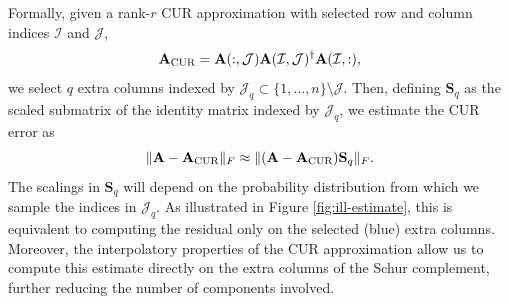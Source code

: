 \documentclass[11pt]{article}
\newcommand{\curX}{\mathbf{A}_{\textup{CUR}}}
\begin{document}
Formally, given a rank-$r$ CUR approximation with selected row and column indices $\mathcal{I}$ and $\mathcal{J}$,
\begin{equation}
    \curX = \mathbf{A}(:,\mathcal{J}) \mathbf{A}(\mathcal{I},\mathcal{J})^\dag
    \mathbf{A}(\mathcal{I},:),
\end{equation}
we select $q$ extra columns indexed by $\mathcal{J}_q \subset \{1, \dots, n\} \setminus \mathcal{J}$. Then, defining $\mathbf{S}_q$ as the scaled submatrix of the identity matrix indexed by $\mathcal{J}_q$, we estimate the CUR error as
\begin{equation}
    \label{eq:estimator}
    \| \mathbf{A} - \curX\|_F \approx \|( \mathbf
    {A}-\curX) \mathbf{S}_q\|_F.
\end{equation}
The scalings in $\mathbf{S}_q$ will depend on the probability distribution from which we sample the indices in $\mathcal{J}_q$.
As illustrated in Figure \ref{fig:ill-estimate}, this is equivalent to computing the residual only on the selected (blue) extra columns.
Moreover, the interpolatory properties of the CUR approximation allow us to compute this estimate directly on the extra columns of the Schur complement, further reducing the number of components involved.
\end{document}
